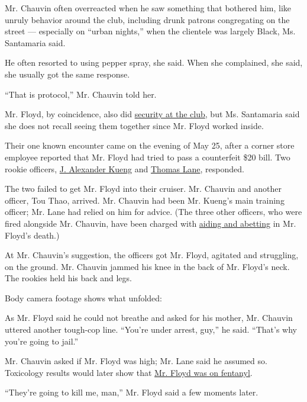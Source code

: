 Mr. Chauvin often overreacted when he saw something that bothered him,
like unruly behavior around the club, including drunk patrons
congregating on the street --- especially on ``urban nights,'' when the
clientele was largely Black, Ms. Santamaria said.

He often resorted to using pepper spray, she said. When she complained,
she said, she usually got the same response.

``That is protocol,'' Mr. Chauvin told her.

Mr. Floyd, by coincidence, also did
\href{https://www.nytimes3xbfgragh.onion/2020/05/29/us/derek-chauvin-george-floyd-worked-together.html}{security
at the club}, but Ms. Santamaria said she does not recall seeing them
together since Mr. Floyd worked inside.

Their one known encounter came on the evening of May 25, after a corner
store employee reported that Mr. Floyd had tried to pass a counterfeit
\$20 bill. Two rookie officers,
\href{https://www.nytimes3xbfgragh.onion/2020/06/27/us/minneapolis-police-officer-kueng.html}{J.
Alexander Kueng} and
\href{https://www.nytimes3xbfgragh.onion/2020/07/08/us/george-floyd-body-camera-transcripts.html}{Thomas
Lane}, responded.

The two failed to get Mr. Floyd into their cruiser. Mr. Chauvin and
another officer, Tou Thao, arrived. Mr. Chauvin had been Mr. Kueng's
main training officer; Mr. Lane had relied on him for advice. (The three
other officers, who were fired alongside Mr. Chauvin, have been charged
with
\href{https://www.nytimes3xbfgragh.onion/2020/07/08/us/george-floyd-body-camera-transcripts.html}{aiding
and abetting} in Mr. Floyd's death.)

At Mr. Chauvin's suggestion, the officers got Mr. Floyd, agitated and
struggling, on the ground. Mr. Chauvin jammed his knee in the back of
Mr. Floyd's neck. The rookies held his back and legs.

Body camera footage shows what unfolded:

As Mr. Floyd said he could not breathe and asked for his mother, Mr.
Chauvin uttered another tough-cop line. ``You're under arrest, guy,'' he
said. ``That's why you're going to jail.''

Mr. Chauvin asked if Mr. Floyd was high; Mr. Lane said he assumed so.
Toxicology results would later show that
\href{https://www.nytimes3xbfgragh.onion/article/george-floyd-autopsy-michael-baden.html}{Mr.
Floyd was on fentanyl}.

``They're going to kill me, man,'' Mr. Floyd said a few moments later.

